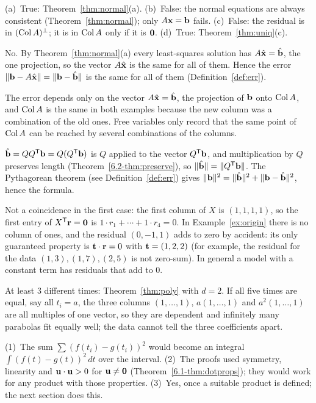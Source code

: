 \documentclass[11pt]{article}
\begin{document}
\begin{description}[leftmargin=0pt,itemsep=5pt]
  \item[Knowledge Check \ref{kc:kctf}.] (a)~True: Theorem~\ref{thm:normal}(a). (b)~False: the normal equations are always consistent (Theorem~\ref{thm:normal}); only $A\mathbf{x}=\mathbf{b}$ fails. (c)~False: the residual is in $(\operatorname{Col} A)^{\perp}$; it is in $\operatorname{Col} A$ only if it is $\mathbf{0}$. (d)~True: Theorem~\ref{thm:uniq}(c).
  \item[Pause and think \ref{think:closest}.] No. By Theorem~\ref{thm:normal}(a) every least-squares solution has $A\hat{\mathbf{x}}=\hat{\mathbf{b}}$, the one projection, so the vector $A\hat{\mathbf{x}}$ is the same for all of them. Hence the error $\lVert\mathbf{b}-A\hat{\mathbf{x}}\rVert=\lVert\mathbf{b}-\hat{\mathbf{b}}\rVert$ is the same for all of them (Definition~\ref{def:err}).
  \item[Pause and think \ref{think:freevar}.] The error depends only on the vector $A\hat{\mathbf{x}}=\hat{\mathbf{b}}$, the projection of $\mathbf{b}$ onto $\operatorname{Col} A$, and $\operatorname{Col} A$ is the same in both examples because the new column was a combination of the old ones. Free variables only record that the same point of $\operatorname{Col} A$ can be reached by several combinations of the columns.
  \item[Pause and think \ref{think:qrerr}.] $\hat{\mathbf{b}}=QQ^{\mathsf T}\mathbf{b}=Q(Q^{\mathsf T}\mathbf{b})$ is $Q$ applied to the vector $Q^{\mathsf T}\mathbf{b}$, and multiplication by $Q$ preserves length (Theorem~\ref{6.2-thm:preserve}), so $\lVert\hat{\mathbf{b}}\rVert=\lVert Q^{\mathsf T}\mathbf{b}\rVert$. The Pythagorean theorem (see Definition~\ref{def:err}) gives $\lVert\mathbf{b}\rVert^2=\lVert\hat{\mathbf{b}}\rVert^2+\lVert\mathbf{b}-\hat{\mathbf{b}}\rVert^2$, hence the formula.
  \item[Pause and think \ref{think:zerosum}.] Not a coincidence in the first case: the first column of $X$ is $(1,1,1,1)$, so the first entry of $X^{\mathsf T}\mathbf{r}=\mathbf{0}$ is $1\cdot r_1+\cdots+1\cdot r_4=0$. In Example~\ref{ex:origin} there is no column of ones, and the residual $(0,-1,1)$ adds to zero by accident: its only guaranteed property is $\mathbf{t}\cdot\mathbf{r}=0$ with $\mathbf{t}=(1,2,2)$ (for example, the residual for the data $(1,3),(1,7),(2,5)$ is not zero-sum). In general a model with a constant term has residuals that add to $0$.
  \item[Pause and think \ref{think:distinct}.] At least $3$ different times: Theorem~\ref{thm:poly} with $d=2$. If all five times are equal, say all $t_i=a$, the three columns $(1,\dots,1)$, $a(1,\dots,1)$ and $a^2(1,\dots,1)$ are all multiples of one vector, so they are dependent and infinitely many parabolas fit equally well; the data cannot tell the three coefficients apart.
  \item[Questions to think about.] (1)~The sum $\sum(f(t_i)-g(t_i))^2$ would become an integral $\int(f(t)-g(t))^2\,dt$ over the interval. (2)~The proofs used symmetry, linearity and $\mathbf{u}\cdot\mathbf{u}>0$ for $\mathbf{u}\neq\mathbf{0}$ (Theorem~\ref{6.1-thm:dotprops}); they would work for any product with those properties. (3)~Yes, once a suitable product is defined; the next section does this.
\end{description}
\end{document}
